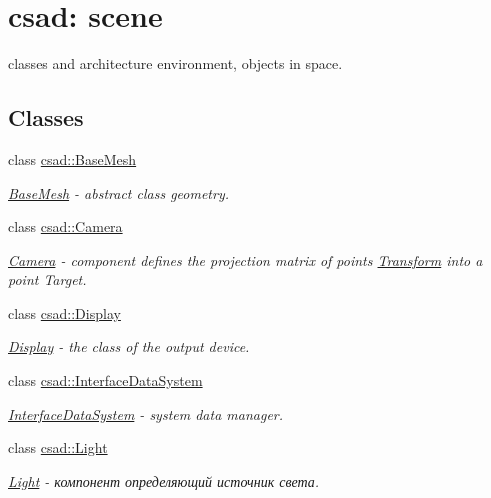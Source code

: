 \hypertarget{group__scene}{\section{csad\-: scene}
\label{group__scene}
}


classes and architecture environment, objects in space.  


\subsection*{Classes}
\begin{DoxyCompactItemize}
\item 
class \hyperlink{classcsad_1_1_base_mesh}{csad\-::\-Base\-Mesh}
\begin{DoxyCompactList}\small\item\em \hyperlink{classcsad_1_1_base_mesh}{Base\-Mesh} -\/ abstract class geometry. \end{DoxyCompactList}\item 
class \hyperlink{classcsad_1_1_camera}{csad\-::\-Camera}
\begin{DoxyCompactList}\small\item\em \hyperlink{classcsad_1_1_camera}{Camera} -\/ component defines the projection matrix of points \hyperlink{classcsad_1_1_transform}{Transform} into a point Target. \end{DoxyCompactList}\item 
class \hyperlink{classcsad_1_1_display}{csad\-::\-Display}
\begin{DoxyCompactList}\small\item\em \hyperlink{classcsad_1_1_display}{Display} -\/ the class of the output device. \end{DoxyCompactList}\item 
class \hyperlink{classcsad_1_1_interface_data_system}{csad\-::\-Interface\-Data\-System}
\begin{DoxyCompactList}\small\item\em \hyperlink{classcsad_1_1_interface_data_system}{Interface\-Data\-System} -\/ system data manager. \end{DoxyCompactList}\item 
class \hyperlink{classcsad_1_1_light}{csad\-::\-Light}
\begin{DoxyCompactList}\small\item\em \hyperlink{classcsad_1_1_light}{Light} -\/ компонент определяющий источник света. \end{DoxyCompactList}\item 

\end{DoxyCompactItemize}
